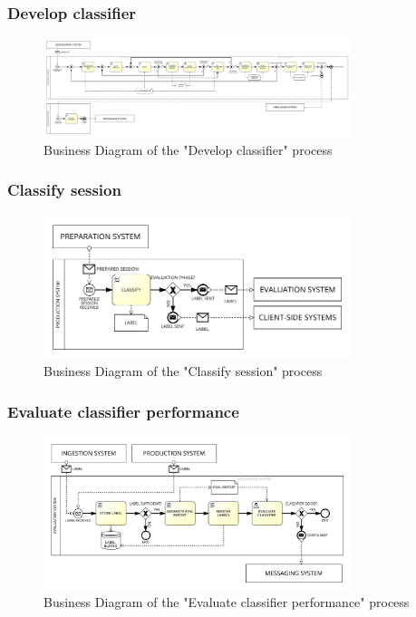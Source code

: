 \subsubsection{Develop classifier}
\label{sec:develop_classifier}

\begin{figure}[H]
\centering
\includegraphics[width=0.8\textwidth]{figures/Business Diagram - Develop Classifier.png}
\caption{Business Diagram of the "Develop classifier" process}
\label{fig:develop_classifier}
\end{figure}

\subsubsection{Classify session}
\label{sec:classify_session}

\begin{figure}[H]
\centering
\includegraphics[width=0.8\textwidth]{figures/Business Diagram - Classify Session.png}
\caption{Business Diagram of the "Classify session" process}
\label{fig:classify_session}
\end{figure}

\subsubsection{Evaluate classifier performance}
\label{sec:evaluate_classifier_performance}

\begin{figure}[H]
\centering
\includegraphics[width=0.8\textwidth]{figures/Business Diagram - Evaluate Classifier Performance.png}
\caption{Business Diagram of the "Evaluate classifier performance" process}
\label{fig:evaluate_classifier_performance}
\end{figure}

